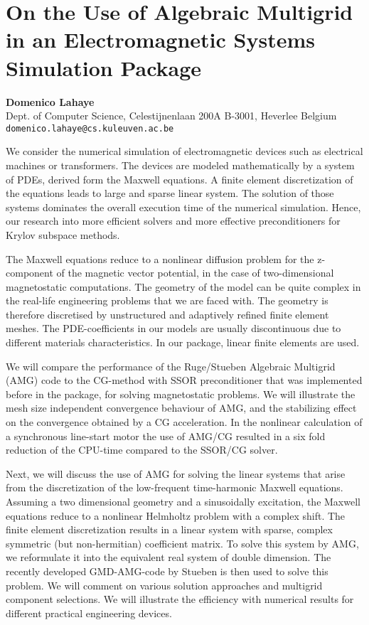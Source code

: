 \documentclass[11pt]{article}
\newcommand{\nextab}[4]{
	\section{#2}
	{\bf #1} \\ \nopagebreak
	{#3} \\ \nopagebreak
	{\tt #4} \nopagebreak
	}
\begin{document}

\nextab{Domenico Lahaye}
	{On the Use of Algebraic Multigrid in an Electromagnetic
		Systems Simulation Package}
	{Dept. of Computer Science, Celestijnenlaan 200A B-3001,
		Heverlee Belgium}
	{domenico.lahaye@cs.kuleuven.ac.be}

We consider the numerical simulation of electromagnetic devices such as
electrical machines or transformers. The devices are modeled mathematically
by a system of PDEs, derived form the Maxwell equations. A finite
element discretization of the equations leads to large and sparse linear
system. The solution of those systems dominates the overall execution
time of the numerical simulation. Hence, our research into more efficient
solvers and more effective preconditioners for Krylov subspace methods.

The Maxwell equations reduce to a nonlinear diffusion problem for the
z-component of the magnetic vector potential, in the case of two-dimensional
magnetostatic computations. The geometry of the model can be quite complex
in the real-life engineering problems that we are faced with. The geometry is
therefore discretised by unstructured and adaptively refined finite element
meshes. The PDE-coefficients in our models are usually discontinuous due to
different materials characteristics. In our package, linear finite elements
are used.

We will compare the performance of the Ruge/Stueben Algebraic Multigrid (AMG)
code to the CG-method  with SSOR preconditioner that was implemented before
in the package, for solving magnetostatic problems.
We will illustrate the mesh size independent convergence behaviour of AMG,
and the stabilizing effect on the convergence obtained by a CG acceleration.
In the nonlinear calculation of a synchronous line-start motor the use of
AMG/CG resulted in a six fold reduction of the CPU-time compared  to the
SSOR/CG solver.

Next, we will discuss the use of AMG for solving the linear systems that arise
from the discretization of the low-frequent time-harmonic Maxwell equations.
Assuming a two dimensional geometry and a sinusoidally excitation, the Maxwell
equations reduce to a nonlinear Helmholtz problem with a complex shift.
The finite element discretization results in a linear system with sparse,
complex symmetric (but non-hermitian) coefficient matrix.
To solve this system by AMG, we reformulate it into the equivalent real
system of double dimension. The recently developed GMD-AMG-code by Stueben
is then used to solve this problem.  We will comment on various solution
approaches and multigrid component selections.  We will illustrate the
efficiency with numerical results for different practical engineering devices.
\end{document}
